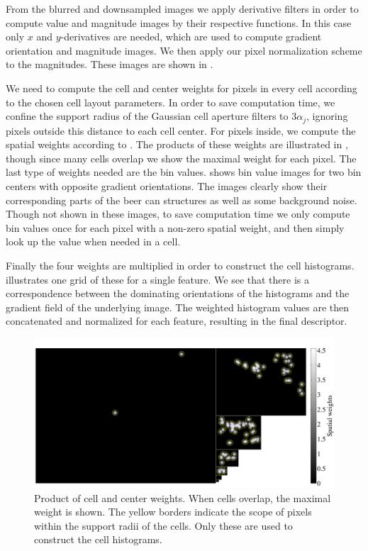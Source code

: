 \documentclass[thesis.tex]{subfiles}
\begin{document}
From the blurred and downsampled images we apply derivative filters in order to compute value and magnitude images by their respective functions. In this case only $x$ and $y$-derivatives are needed, which are used to compute gradient orientation and magnitude images. We then apply our pixel normalization scheme to the magnitudes. These images are shown in .

We need to compute the cell and center weights for pixels in every cell according to the chosen cell layout parameters. In order to save computation time, we confine the support radius of the Gaussian cell aperture filters to $3 \alpha_j$, ignoring pixels outside this distance to each cell center. For pixels inside, we compute the spatial weights according to . The products of these weights are illustrated in , though since many cells overlap we show the maximal weight for each pixel.
The last type of weights needed are the bin values.  shows bin value images for two bin centers with opposite gradient orientations. The images clearly show their corresponding parts of the beer can structures as well as some background noise. Though not shown in these images, to save computation time we only compute bin values once for each pixel with a non-zero spatial weight, and then simply look up the value when needed in a cell.


Finally the four weights are multiplied in order to construct the cell histograms.  illustrates one grid of these for a single feature. We see that there is a correspondence between the dominating orientations of the histograms and the gradient field of the underlying image. The weighted histogram values are then concatenated and normalized for each feature, resulting in the final descriptor.

\begin{figure}[tb]
    \centering
    \includegraphics[width=\textwidth]{img/cellHistScaleSpacesSpatialWeights.pdf}
    \caption{Product of cell and center weights. When cells overlap, the maximal weight is shown. The yellow borders indicate the scope of pixels within the support radii of the cells. Only these are used to construct the cell histograms.}
    \label{fig:cellHistScaleSpacesSpatialWeights}
\end{figure}
\end{document}
